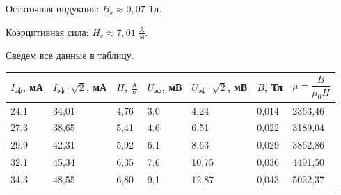 \documentclass[a4paper,12pt]{article} %
\begin{document}
\vspace{5mm}
Остаточная индукция: $B_s \approx 0,07$ Тл.

\vspace{5mm}
Коэрцитивная сила: $H_c \approx 7,01$ $\frac{\text{А}}{\text{м}}$. 

\newpage
Сведем все данные в таблицу.


\begin{table}[h!]
	\centering
	\begin{tabular}{|l|l|l|l|l|l|l|}
		\hline
		\multicolumn{1}{|c|}{$I_{\text{эф}}$, мА} & \multicolumn{1}{c|}{$I_{\text{эф}} \cdot \sqrt{2}$, мА} & \multicolumn{1}{c|}{$H$, $\frac{\text{А}}{\text{м}}$} & \multicolumn{1}{c|}{$U_{\text{эф}}$, мВ} & \multicolumn{1}{c|}{$U_{\text{эф}} \cdot \sqrt{2}$, мВ} & \multicolumn{1}{c|}{$B$, Тл} & \multicolumn{1}{c|}{$\mu = \dfrac{B}{\mu_0 H}$} \\ \hline
		24,1                                      & 34,01                                                   & 4,76                                                  & 3,0                                      & 4,24                                                    & 0,014                        & 2363,46                                         \\ \hline
		27,3                                      & 38,65                                                   & 5,41                                                  & 4,6                                      & 6,51                                                    & 0,022                        & 3189,04                                         \\ \hline
		29,9                                      & 42,31                                                   & 5,92                                                  & 6,1                                      & 8,63                                                    & 0,029                        & 3862,86                                         \\ \hline
		32,1                                      & 45,34                                                   & 6,35                                                  & 7,6                                      & 10,75                                                   & 0,036                        & 4491,50                                         \\ \hline
		34,3                                      & 48,55                                                   & 6,80                                                  & 9,1                                      & 12,87                                                   & 0,043                        & 5022,37                                         \\ \hline

\end{tabular}
\end{table}
\end{document}
